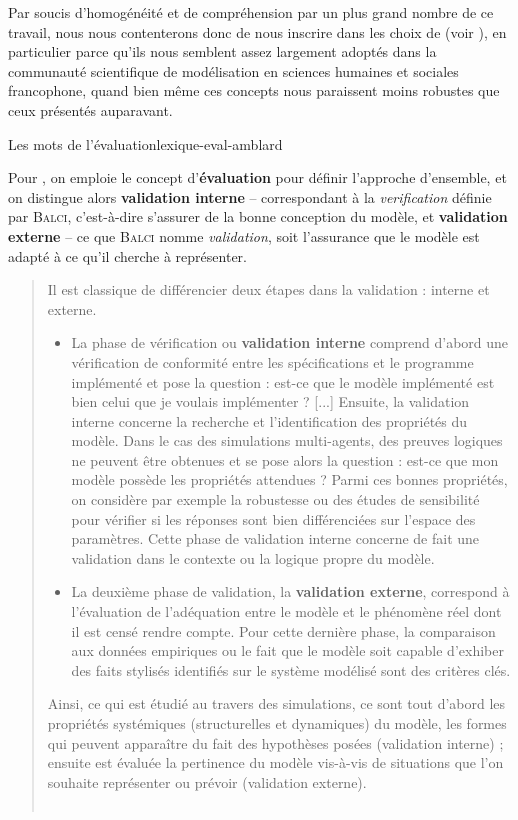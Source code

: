 Par soucis d'homogénéité et de compréhension par un plus grand nombre de ce travail, nous nous contenterons donc de nous inscrire dans les choix de \cite{amblard_evaluation_2006} (voir ), en particulier parce qu'ils nous semblent assez largement adoptés dans la communauté scientifique de modélisation en sciences humaines et sociales francophone, quand bien même ces concepts nous paraissent moins robustes que ceux présentés auparavant.

\begin{encadre}{Les mots de l'évaluation}{lexique-eval-amblard}

Pour \cite{amblard_evaluation_2006}, on emploie le concept d'\textbf{évaluation} pour définir l'approche d'ensemble, et on distingue alors \og \textbf{validation interne}\fg{} -- correspondant à la \textit{verification} définie par \textsc{Balci}, c'est-à-dire s'assurer de la bonne conception du modèle, et \og \textbf{validation externe}\fg{} -- ce que \textsc{Balci} nomme \textit{validation}, soit l'assurance que le modèle est adapté à ce qu'il cherche à représenter.

\begin{quotation}
\og Il est classique de différencier deux étapes dans la validation : interne et externe.
\begin{itemize}
	\item La phase de vérification ou \textbf{validation interne} comprend d'abord une vérification de conformité entre les spécifications et le programme implémenté et pose la question : est-ce que le modèle implémenté est bien celui que je voulais implémenter ? [...]
	Ensuite, la validation interne concerne la recherche et l'identification des propriétés du modèle.
	Dans le cas des simulations multi-agents, des preuves logiques ne peuvent être obtenues et se pose alors la question : est-ce que mon modèle possède les propriétés attendues ?
	Parmi ces bonnes propriétés, on considère par exemple la robustesse ou des études de sensibilité pour vérifier si les réponses sont bien différenciées sur l'espace des paramètres.
	Cette phase de validation interne concerne de fait une validation dans le contexte ou la logique propre du modèle.

	\item La deuxième phase de validation, la \textbf{validation externe}, correspond à l’évaluation de l’adéquation entre le modèle et le phénomène réel dont il est censé rendre compte.
	Pour cette dernière phase, la comparaison aux données empiriques ou le fait que le modèle soit capable d'exhiber des faits stylisés identifiés sur le système modélisé sont des critères clés.
\end{itemize}
Ainsi, ce qui est étudié au travers des simulations, ce sont tout d’abord les propriétés systémiques (structurelles et dynamiques) du modèle, les formes qui peuvent apparaître du fait des hypothèses posées (validation interne) ; ensuite est évaluée la pertinence du modèle vis-à-vis de situations que l’on souhaite représenter ou prévoir (validation externe).\fg{}\\
	\mbox{}~ \hfill \cite[110-111]{amblard_evaluation_2006}
\end{quotation}


\end{encadre}

